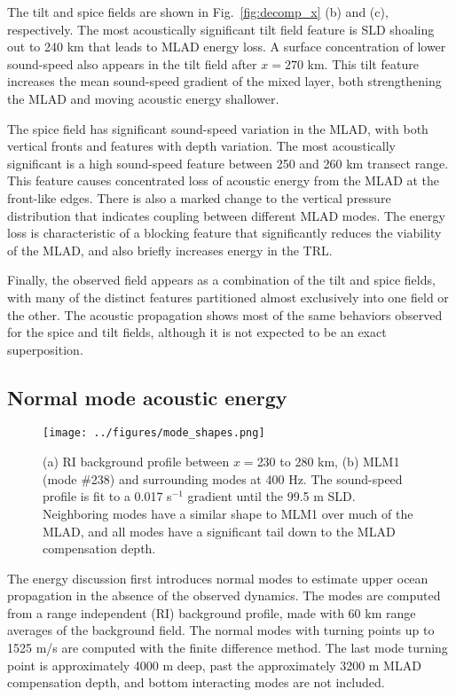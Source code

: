 \documentclass[preprint,NumberedRefs]{JASA}
\begin{document}
The tilt and spice fields are shown in Fig.~\ref{fig:decomp_x} (b) and (c), respectively. The most acoustically significant tilt field feature is SLD shoaling out to 240 km that leads to MLAD energy loss. A surface concentration of lower sound-speed also appears in the tilt field after $x=270$ km. This tilt feature increases the mean sound-speed gradient of the mixed layer, both strengthening the MLAD and moving acoustic energy shallower.

The spice field has significant sound-speed variation in the MLAD, with both vertical fronts and features with depth variation. The most acoustically significant is a high sound-speed feature between 250 and 260 km transect range. This feature causes concentrated loss of acoustic energy from the MLAD at the front-like edges. There is also a marked change to the vertical pressure distribution that indicates coupling between different MLAD modes. The energy loss is characteristic of a blocking feature\cite{colosi2020observations} that significantly reduces the viability of the MLAD, and also briefly increases energy in the TRL.

Finally, the observed field appears as a combination of the tilt and spice fields, with many of the distinct features partitioned almost exclusively into one field or the other. The acoustic propagation shows most of the same behaviors observed for the spice and tilt fields, although it is not expected to be an exact superposition.

\subsection{Normal mode acoustic energy}
\begin{figure}
\texttt{[image: ../figures/mode\_shapes.png]}
    \caption{\label{fig:bg_modes}{(a) RI background profile between $x=$230 to 280 km, (b) MLM1 (mode \#238) and surrounding modes at 400 Hz. The sound-speed profile is fit to a 0.017 s$^{-1}$ gradient until the 99.5 m SLD. Neighboring modes have a similar shape to MLM1 over much of the MLAD, and all modes have a significant tail down to the MLAD compensation depth.}}
\end{figure}

The energy discussion first introduces normal modes to estimate upper ocean propagation in the absence of the observed dynamics. The modes are computed from a range independent (RI) background profile, made with 60 km range averages of the background field. The normal modes with turning points up to 1525 m/s are computed with the finite difference method.\cite{jensen2011computational} The last mode turning point is approximately 4000 m deep, past the approximately 3200 m MLAD compensation depth, and bottom interacting modes are not included.
\end{document}

